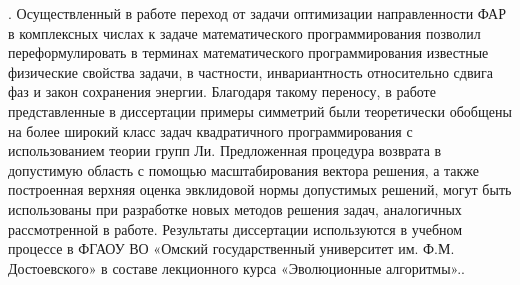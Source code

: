 {\theorInfluence}.
Осуществленный в работе переход от задачи оптимизации направленности ФАР в комплексных числах к задаче математического программирования позволил переформулировать в терминах математического программирования известные физические свойства задачи, в частности, инвариантность относительно сдвига фаз и закон сохранения энергии. Благодаря такому переносу, в работе~ представленные в диссертации примеры симметрий были теоретически обобщены на более широкий класс задач квадратичного программирования с использованием теории групп Ли. Предложенная процедура возврата в допустимую область с помощью масштабирования вектора решения, а также построенная верхняя оценка эвклидовой нормы допустимых решений, могут быть использованы при разработке новых методов решения задач, аналогичных рассмотренной в работе. Результаты диссертации используются в учебном процессе в ФГАОУ ВО «Омский государственный университет
им. Ф.М. Достоевского» в составе лекционного курса «Эволюционные алгоритмы»..


